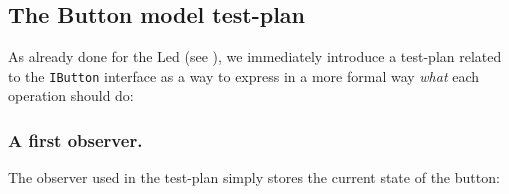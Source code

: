 

\subsection{The Button model test-plan}

As already done for the Led (see ), we immediately introduce a test-plan related to the \texttt{IButton} interface as a way to express in a more formal way \textit{what} each operation should do:



\subsubsection{A first observer.\\}

The observer used in the test-plan simply stores the current state of the button:



